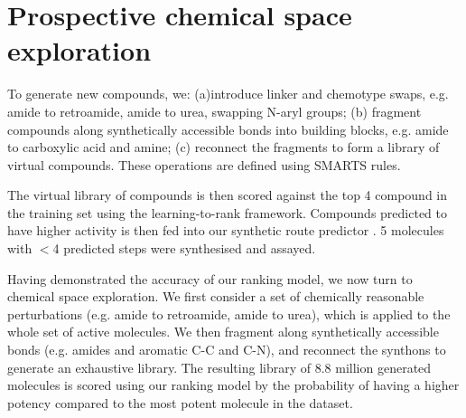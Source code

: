 \section{Prospective chemical space exploration}


To generate new compounds, we: (a)introduce linker and chemotype swaps, e.g. amide to retroamide, amide to urea, swapping N-aryl groups; (b) fragment compounds along synthetically accessible bonds into building blocks, e.g. amide to carboxylic acid and amine; (c) reconnect the fragments to form a library of virtual compounds. These operations are defined using SMARTS rules. 

The virtual library of compounds is then scored against the top 4 compound in the training set using the learning-to-rank framework. Compounds predicted to have higher activity is then fed into our synthetic route predictor \cite{schwaller2019molecular,yang2019molecular}. 5 molecules with $<$4 predicted steps were synthesised and assayed. 



Having demonstrated the accuracy of our ranking model, we now turn to chemical space exploration. We first consider a set of chemically reasonable perturbations (e.g. amide to retroamide, amide to urea), which is applied to the whole set of active molecules. We then fragment along synthetically accessible bonds (e.g. amides and aromatic C-C and C-N), and reconnect the synthons to generate an exhaustive library. The resulting library of 8.8 million generated molecules is scored using our ranking model by the probability of having a higher potency compared to the most potent molecule in the dataset.  %


